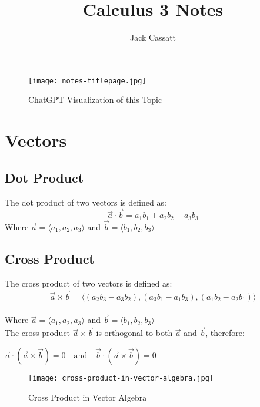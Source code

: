 \documentclass{article}
\begin{document}
\title{\centering Calculus 3 Notes}
\author{Jack Cassatt}
\maketitle

\begin{figure}[h]
    \centering
    \texttt{[image: notes-titlepage.jpg]}
    \caption{ChatGPT Visualization of this Topic}
\end{figure}

\newpage

\section{Vectors}
\subsection{Dot Product}
The dot product of two vectors is defined as:
\begin{equation}
    \vec{a} \cdot \vec{b} = a_1b_1 + a_2b_2 + a_3b_3
\end{equation}
Where $\vec{a} = \langle a_1, a_2, a_3 \rangle$ and $\vec{b} = \langle b_1, b_2, b_3 \rangle$

\subsection{Cross Product}
\indent The cross product of two vectors is defined as:
\begin{equation}
    \vec{a} \times \vec{b} = \langle (a_2b_3 - a_3b_2), (a_3b_1 - a_1b_3), (a_1b_2 - a_2b_1) \rangle
\end{equation} \\
Where $\vec{a} = \langle a_1, a_2, a_3 \rangle$ and $\vec{b} = \langle b_1, b_2, b_3 \rangle$ \\
\newline
The cross product $\vec{a} \times \vec{b}$ is orthogonal to both $\vec{a}$ and $\vec{b}$, therefore: \\
\begin{center}
$\vec{a} \cdot (\vec{a} \times \vec{b}) = 0 \quad \text{and} \quad
\vec{b} \cdot (\vec{a} \times \vec{b}) = 0$
\end{center}
\begin{figure}[h]
    \centering
    \texttt{[image: cross-product-in-vector-algebra.jpg]}
    \caption{Cross Product in Vector Algebra}
\end{figure}
\end{document}
